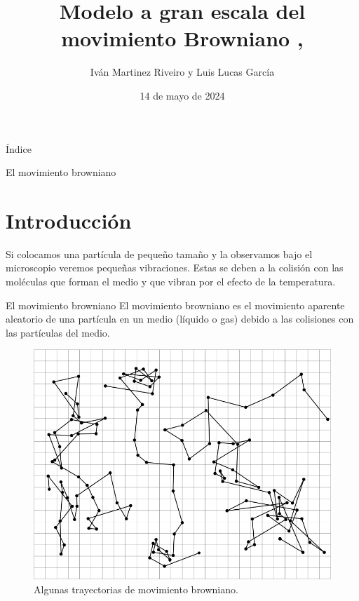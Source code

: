 \documentclass{beamer}
\title[Movimiento browniano]{Modelo a gran escala del movimiento Browniano \cite{Mazo_2014}, \cite{Schilling_Partzsch_Böttcher_2021}}
\author[Iván y Luis]{Iván Martinez Riveiro y Luis Lucas García}
\institute[UA]{Universidad de Alicante}
\date{14 de mayo de 2024}
\begin{document}
\begin{frame}
\maketitle
\end{frame}

\begin{frame}{Índice}
\tableofcontents
\end{frame}

\begin{frame}{El movimiento browniano}
\section{Introducción}

Si colocamos una partícula de pequeño tamaño y la observamos bajo el microscopio veremos pequeñas vibraciones. Estas se deben a la colisión con las moléculas que forman el medio y que vibran por el efecto de la temperatura.

\begin{block}{El movimiento browniano}
El movimiento browniano es el movimiento aparente aleatorio de una partícula en un medio (líquido o gas) debido a las colisiones con las partículas del medio.
\end{block}

\begin{figure}[h!]
\begin{center}
\includegraphics[scale=0.12]{2drandom.png}
\caption{Algunas trayectorias de movimiento browniano.}
\end{center}
\end{figure}
\end{frame}
\end{document}
